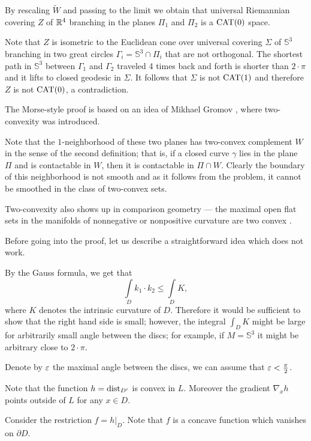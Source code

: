 By rescaling $\tilde W$ and passing to the limit we obtain that universal Riemannian covering $Z$ of $\mathbb{R}^4$ branching in the planes $\Pi_1$ and $\Pi_2$ is a $\operatorname{\rm CAT}\nolimits(0)$ space.

Note that $Z$ is isometric to the Euclidean cone over universal covering $\Sigma$ of $\mathbb{S}^3$ branching in two great circles $\Gamma_i=\mathbb{S}^3\cap \Pi_i$ that are not orthogonal.
The shortest path in $\mathbb{S}^3$ between $\Gamma_1$ and $\Gamma_2$ traveled 4 times back and forth is shorter than $2\cdot\pi$ and it lifts to closed geodesic in $\Sigma$.
It follows that $\Sigma$ is not $\operatorname{\rm CAT}\nolimits(1)$ and therefore $Z$ is not $\operatorname{\rm CAT}\nolimits(0)$, a contradiction.\qeds

The Morse-style proof is based on an idea of Mikhael Gromov \cite[see \S\textonehalf{} in][]{gromov-SGMC}, where two-convexity was introduced.

Note that the $1$-neighborhood of these two planes has two-convex complement $W$ in the sense of the second definition;
that is, if a closed curve $\gamma$ lies in the plane $\Pi$
and is contactable in $W$, then it is contactable in $\Pi\cap W$.
Clearly the boundary of this neighborhood is not smooth
and as it follows from the problem, it cannot be smoothed in the class of two-convex sets. 

Two-convexity also shows up in comparison geometry --- the maximal open flat sets in the manifolds of nonnegative or nonpositive curvature are two convex \cite{panov-petrunin}.


Before going into the proof, let us describe a straightforward idea which does not work.

By the Gauss formula, we get that 
\[\int\limits_{D}k_1\cdot k_2\le\int\limits_{D}K,\] 
where $K$ denotes the intrinsic curvature of $D$.
Therefore it would be sufficient to show that the right hand side is small;
however, the integral $\int_{D}K$ might be large for arbitrarily small angle between the discs; for example, if $M=\mathbb{S}^3$ it might be arbitrary close to $2\cdot \pi$.

\medskip

Denote by $\varepsilon$ the maximal angle between the discs, we can assume that $\varepsilon<\tfrac\pi2$.

Note that the function $h=\operatorname{\rm dist}\nolimits_{D'}$ is convex in $L$.
Moreover the gradient $\nabla_xh$ points outside of $L$ for any $x\in D$. 

Consider the restriction $f=h|_D$.
Note that $f$ is a concave function which vanishes on $\partial D$.

